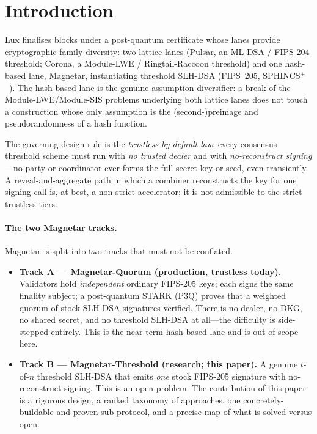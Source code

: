\documentclass[11pt,a4paper]{article}
\begin{document}
\tableofcontents

\section{Introduction}
\label{sec:intro}

Lux finalises blocks under a post-quantum certificate whose lanes provide
cryptographic-family diversity: two lattice lanes (Pulsar, an ML-DSA / FIPS-204
threshold; Corona, a Module-LWE / Ringtail-Raccoon threshold) and one hash-based lane,
Magnetar, instantiating threshold SLH-DSA (FIPS~205, SPHINCS$^+$~\cite{fips205,sphincsplus}).
The hash-based lane is the genuine assumption diversifier: a break of the
Module-LWE/Module-SIS problems underlying both lattice lanes does not touch a
construction whose only assumption is the (second-)preimage and pseudorandomness
of a hash function.

The governing design rule is the \emph{trustless-by-default law}: every consensus
threshold scheme must run with \emph{no trusted dealer} and with
\emph{no-reconstruct signing}---no party or coordinator ever forms the full secret
key or seed, even transiently. A reveal-and-aggregate path in which a combiner
reconstructs the key for one signing call is, at best, a non-strict accelerator; it
is not admissible to the strict trustless tiers.

\paragraph{The two Magnetar tracks.}
Magnetar is split into two tracks that must not be conflated.

\begin{itemize}[leftmargin=1.4em]
\item \textbf{Track A --- Magnetar-Quorum (production, trustless today).}
Validators hold \emph{independent} ordinary FIPS-205 keys; each signs the same
finality subject; a post-quantum STARK (P3Q) proves that a weighted quorum of
stock SLH-DSA signatures verified. There is no dealer, no DKG, no shared secret,
and no threshold SLH-DSA at all---the difficulty is side-stepped entirely. This is
the near-term hash-based lane and is out of scope here.

\item \textbf{Track B --- Magnetar-Threshold (research; this paper).} A genuine
$t$-of-$n$ threshold SLH-DSA that emits \emph{one} stock FIPS-205 signature with
no-reconstruct signing. This is an open problem. The contribution of this paper is
a rigorous design, a ranked taxonomy of approaches, one concretely-buildable and
proven sub-protocol, and a precise map of what is solved versus open.
\end{itemize}
\end{document}
